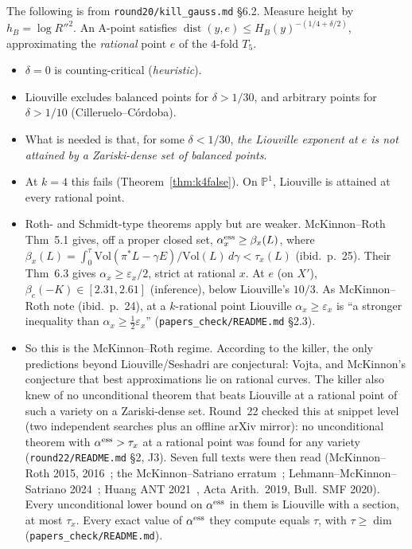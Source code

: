 \documentclass[11pt]{article}
\newcommand{\PP}{\mathbb P}
\newcommand{\dist}{\operatorname{dist}}
\newcommand{\rec}[1]{\texttt{#1}}
\begin{document}
The following is from \rec{round20/kill\_gauss.md} \S6.2.  Measure height by
\(h_B=\log R''^2\).  An A-point satisfies
\(\dist(y,e)\le H_B(y)^{-(1/4+\delta/2)}\), approximating the \emph{rational}
point \(e\) of the \(4\)-fold \(T_5\).
\begin{itemize}[leftmargin=2em]
  \item \(\delta=0\) is counting-critical (\emph{heuristic}).
  \item Liouville excludes balanced points for \(\delta>1/30\), and arbitrary
    points for \(\delta>1/10\) (Cilleruelo--C\'ordoba).
  \item What is needed is that, for some \(\delta<1/30\), \emph{the Liouville
    exponent at \(e\) is not attained by a Zariski-dense set of balanced
    points}.
  \item At \(k=4\) this fails (Theorem~\ref{thm:k4false}).  On \(\PP^1\),
    Liouville is attained at every rational point.
  \item Roth- and Schmidt-type theorems apply but are weaker.
    McKinnon--Roth~\cite{McKinnonRoth2015} Thm~5.1 gives, off a proper closed
    set, \(\alpha^{\rm ess}_x\ge\beta_x(L)\), where
    \(\beta_x(L)=\int_0^{\tau}\mathrm{Vol}(\pi^*L-\gamma E)/\mathrm{Vol}(L)\,d\gamma<\tau_x(L)\)
    (ibid.\ p.~25).  Their Thm~6.3 gives \(\alpha_x\ge\varepsilon_x/2\), strict
    at rational \(x\).  At \(e\) (on \(X'\)), \(\beta_e(-K)\in[2.31,2.61]\)
    (inference), below Liouville's \(10/3\).  As McKinnon--Roth note (ibid.\
    p.~24), at a \(k\)-rational point Liouville \(\alpha_x\ge\varepsilon_x\) is
    ``a stronger inequality than \(\alpha_x\ge\frac12\varepsilon_x\)''
    (\rec{papers_check/README.md} \S2.3).
  \item So this is the McKinnon--Roth regime.  According to the killer, the
    only predictions beyond Liouville/Seshadri are conjectural: Vojta, and
    McKinnon's conjecture that best approximations lie on rational curves.
    The killer also knew of no unconditional theorem that beats Liouville at a
    rational point of such a variety on a Zariski-dense set.  Round~22 checked
    this at snippet level (two independent searches plus an offline arXiv
    mirror): no unconditional theorem with \(\alpha^{\rm ess}>\tau_x\) at a
    rational point was found for any variety (\rec{round22/README.md} \S2,
    J3).  Seven full texts were then read (McKinnon--Roth 2015,
    2016~\cite{McKinnonRoth2015,McKinnonRoth2016}; the McKinnon--Satriano
    erratum~\cite{McKinnonSatriano2021}; Lehmann--McKinnon--Satriano
    2024~\cite{LMS2024}; Huang ANT 2021~\cite{Huang2021}, Acta Arith.\ 2019,
    Bull.\ SMF 2020).  Every unconditional lower bound on \(\alpha^{\rm ess}\)
    in them is Liouville with a section, at most \(\tau_x\).  Every exact value
    of \(\alpha^{\rm ess}\) they compute equals \(\tau\), with \(\tau\ge\dim\)
    (\rec{papers_check/README.md}).
\end{itemize}
\end{document}
